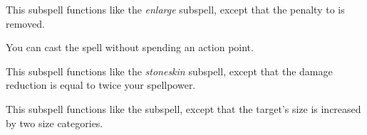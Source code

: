 
This subspell functions like the \textit{enlarge} subspell, except that the penalty to  is removed.






You can cast the spell without spending an action point.






This subspell functions like the \textit{stoneskin} subspell, except that the damage reduction is equal to twice your spellpower.







This subspell functions like the  subspell, except that the target's size is increased by two size categories.





